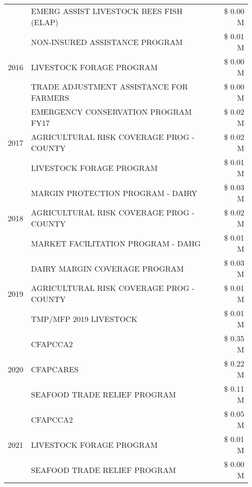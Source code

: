 \begin{tabular}{llr}
 & EMERG ASSIST LIVESTOCK BEES FISH (ELAP) & \$ 0.00 M \\
\cline{1-3}
\multirow[t]{3}{*}{2016} & NON-INSURED ASSISTANCE PROGRAM & \$ 0.01 M \\
 & LIVESTOCK FORAGE PROGRAM & \$ 0.00 M \\
 & TRADE ADJUSTMENT ASSISTANCE FOR FARMERS & \$ 0.00 M \\
\cline{1-3}
\multirow[t]{3}{*}{2017} & EMERGENCY CONSERVATION PROGRAM FY17 & \$ 0.02 M \\
 & AGRICULTURAL RISK COVERAGE PROG - COUNTY & \$ 0.02 M \\
 & LIVESTOCK FORAGE PROGRAM & \$ 0.01 M \\
\cline{1-3}
\multirow[t]{3}{*}{2018} & MARGIN PROTECTION PROGRAM - DAIRY & \$ 0.03 M \\
 & AGRICULTURAL RISK COVERAGE PROG - COUNTY & \$ 0.02 M \\
 & MARKET FACILITATION PROGRAM - DAHG & \$ 0.01 M \\
\cline{1-3}
\multirow[t]{3}{*}{2019} & DAIRY MARGIN COVERAGE PROGRAM & \$ 0.03 M \\
 & AGRICULTURAL RISK COVERAGE PROG - COUNTY & \$ 0.01 M \\
 & TMP/MFP 2019 LIVESTOCK & \$ 0.01 M \\
\cline{1-3}
\multirow[t]{3}{*}{2020} & CFAPCCA2 & \$ 0.35 M \\
 & CFAPCARES & \$ 0.22 M \\
 & SEAFOOD TRADE RELIEF PROGRAM & \$ 0.11 M \\
\cline{1-3}
\multirow[t]{3}{*}{2021} & CFAPCCA2 & \$ 0.05 M \\
 & LIVESTOCK FORAGE PROGRAM & \$ 0.01 M \\
 & SEAFOOD TRADE RELIEF PROGRAM & \$ 0.00 M \\
\cline{1-3}
\bottomrule
\end{tabular}

